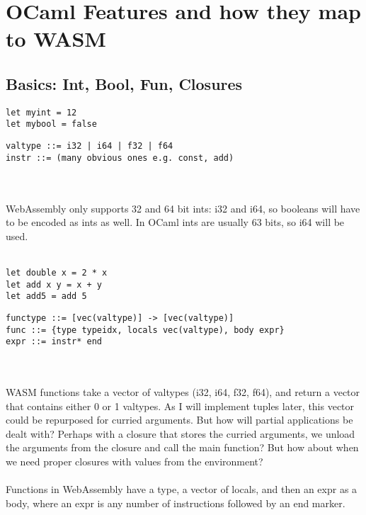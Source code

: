 \documentclass{report}
\begin{document}
\section{OCaml Features and how they map to WASM}
\subsection{Basics: Int, Bool, Fun, Closures}
\begin{minipage}{0.4\linewidth}
\begin{verbatim}
let myint = 12
let mybool = false
\end{verbatim}
\end{minipage}
\begin{minipage}{0.6\linewidth}
\begin{verbatim}
valtype ::= i32 | i64 | f32 | f64
instr ::= (many obvious ones e.g. const, add)
\end{verbatim}
\end{minipage}
\\\\
WebAssembly only supports 32 and 64 bit ints: i32 and i64, so booleans will have to be encoded as ints as well. In OCaml ints are usually 63 bits, so i64 will be used.
\\\\
\begin{minipage}{0.4\linewidth}
\begin{verbatim}
let double x = 2 * x
let add x y = x + y
let add5 = add 5
\end{verbatim}
\end{minipage}
\begin{minipage}{0.6\linewidth}
\begin{verbatim}
functype ::= [vec(valtype)] -> [vec(valtype)]
func ::= {type typeidx, locals vec(valtype), body expr}
expr ::= instr* end
\end{verbatim}
\end{minipage}
\\\\
WASM functions take a vector of valtypes (i32, i64, f32, f64), and return a vector that contains either 0 or 1 valtypes. As I will implement tuples later, this vector could be repurposed for curried arguments. But how will partial applications be dealt with? Perhaps with a closure that stores the curried arguments, we unload the arguments from the closure and call the main function? But how about when we need proper closures with values from the environment?
\\\\
Functions in WebAssembly have a type, a vector of locals, and then an expr as a body, where an expr is any number of instructions followed by an end marker.
\end{document}
